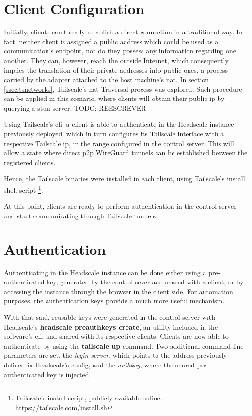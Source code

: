 \documentclass[11pt,twoside,a4paper]{report}
\begin{document}
\section{Client Configuration}

Initially, clients can't really establish a direct connection in a traditional way. In fact, neither client is assigned a public address which could be used as a communication's endpoint, nor do they possess any information regarding one another. They can, however, reach the outside Internet, which consequently implies the translation of their private addresses into public ones, a process carried by the adapter attached to the host machine's \ac{nat}. In section \ref{ssec:tsnetworks}, Tailscale's \ac{nat}-Traversal process was explored. Such procedure can be applied in this scenario, where clients will obtain their public \ac{ip} by querying a \ac{stun} server. TODO: REESCREVER

Using Tailscale's \ac{cli}, a client is able to authenticate in the Headscale instance previously deployed, which in turn configures its Tailscale interface with a respective Tailscale \ac{ip}, in the range configured in the control server. This will allow a state where direct \ac{p2p} WireGuard tunnels can be established between the registered clients.

Hence, the Tailscale binaries were installed in each client, using Tailscale's install shell script \footnote{Tailscale's install script, publicly available online. https://tailscale.com/install.sh}.

At this point, clients are ready to perform authentication in the control server and start communicating through Tailscale tunnels.

\section{Authentication}

Authenticating in the Headscale instance can be done either using a pre-authenticated key, generated by the control sever and shared with a client, or by accessing the instance through the browser in the client side. For automation purposes, the authentication keys provide a much more useful mechanism.

With that said, reusable keys were generated in the control server with Headscale's \textbf{headscale preauthkeys create}, an utility included in the software's \ac{cli}, and shared with its respective clients. Clients are now able to authenticate by using the \textbf{tailscale up} command. Two additional command-line parameters are set, the \emph{login-server}, which points to the address previously defined in Headscale's config, and the \emph{authkey}, where the shared pre-authenticated key is injected.
\end{document}
